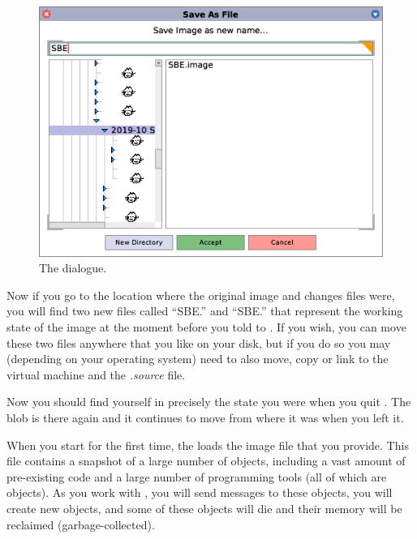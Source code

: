 \documentclass[a4paper,10pt,twoside]{book}
\begin{document}
\begin{figure}[htb]
\begin{minipage}[b]{0.48\textwidth}
	{\centerline {\includegraphics[scale=0.7]{saveAs}}}
	\caption{The  dialogue.\label{fig:saveas}}
\end{minipage}
\end{figure}


Now if you go to the location where the original image and changes files were, you will find two new files called ``SBE.'' and ``SBE.'' that represent the working state of the \sq image at the moment before you told \sq to .
If you wish, you can move these two files anywhere that you like on your disk, but if you do so you may (depending on your operating system) need to also move, copy or link to the virtual machine and the \emph{.source} file.


Now you should find yourself in precisely the state you were when you quit \sq. The blob is there again and it continues to move from where it was when you left it.

When you start \sq for the first time, the \sq {} loads the image file that you provide. This file contains a snapshot of a large number of objects, including a vast amount of pre-existing code and a large number of programming tools (all of which are objects). As you work with \sq, you will send messages to these objects, you will create new objects, and some of these objects will die and their memory will be reclaimed (\ie garbage-collected).
\end{document}
